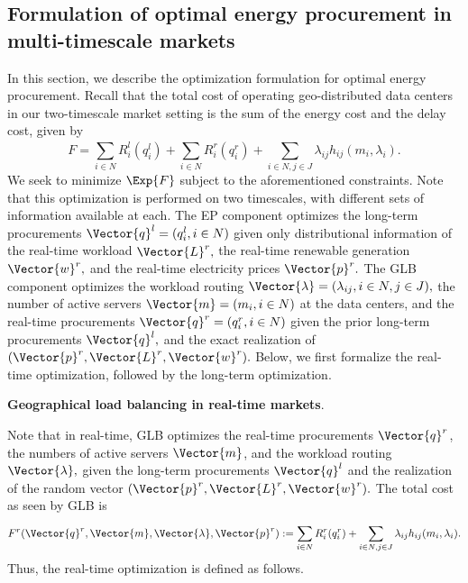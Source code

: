 
\subsection{Formulation of optimal energy procurement in multi-timescale markets}

In this section, we describe the optimization formulation for optimal energy procurement. Recall that the total cost of operating geo-distributed data centers in our two-timescale market setting is the sum of the energy cost and the delay cost, given by $$F = \sum_{i\in N}^{} R^l_i(q^l_i) + \sum_{i \in N}^{} R_i^r(q^r_i)+ \sum_{i \in N,j \in J} \lambda_{ij}h_{ij}(m_i,\lambda_i).$$
We seek to minimize $\Exp{F}$ subject to the aforementioned constraints. Note that this optimization is performed on two timescales, with different sets of information available at each. The EP component optimizes the long-term procurements $\Vector{q}^l = (q^l_i, i\in N)$ given only distributional information of the real-time workload $\Vector{L}^r,$
the real-time renewable generation $\Vector{w}^r,$ and the real-time electricity prices $\Vector{p}^r.$ The GLB component optimizes the workload routing $\Vector{\lambda} = (\lambda_{ij},i\in N,j \in J),$ the number of active servers $\Vector{m} = (m_i,i \in N)$ at the data centers, and the real-time procurements $\Vector{q}^r = (q^r_i,i \in
N)$ given the prior long-term procurements $\Vector{q}^l,$ and the exact realization of $(\Vector{p}^r,\Vector{L}^r,\Vector{w}^r).$
Below, we first formalize the real-time optimization, followed by the long-term optimization.

\textbf{Geographical load balancing in real-time markets}. 

Note that in real-time, GLB optimizes the real-time procurements
$\Vector{q}^r$, the numbers of active servers $\Vector{m}$, and the workload routing $\Vector{\lambda},$ given the long-term procurements $\Vector{q}^l$ and the realization of the random vector $(\Vector{p}^r,\Vector{L}^r,\Vector{w}^r).$ The total cost as seen by GLB is $$F^r(\Vector{q}^r, \Vector{m},\Vector{\lambda},\Vector{p}^r)
:= \sum_{i \in N}^{} R_i^r(q^r_i)+ \sum_{i\in N, j \in J}
\lambda_{ij}h_{ij}(m_i,\lambda_i).$$ Thus, the real-time optimization is defined as follows.


